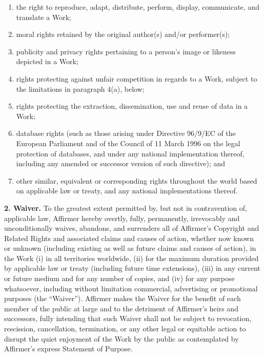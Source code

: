 \begin{enumerate}[noitemsep,label=\roman*.]
  
  \item the right to reproduce, adapt, distribute, perform,
  display, communicate, and translate a Work;
  
  \item  moral rights retained by the original author(s) and/or
  performer(s);
  
  \item publicity and privacy rights pertaining to a person's
  image or likeness depicted in a Work;
  
  \item rights protecting against unfair competition in regards
  to a Work, subject to the limitations in paragraph 4(a),
  below;
  
  \item rights protecting the extraction, dissemination, use and
  reuse of data in a Work;
  
  \item database rights (such as those arising under Directive
  96/9/EC of the European Parliament and of the Council of 11
  March 1996 on the legal protection of databases, and under
  any national implementation thereof, including any amended
  or successor version of such directive); and
  
  \item other similar, equivalent or corresponding rights
  throughout the world based on applicable law or treaty, and
  any national implementations thereof.

\end{enumerate}

\noindent \textbf{2. Waiver.} To the greatest extent
permitted by, but not in contravention of, applicable law,
Affirmer hereby overtly, fully, permanently, irrevocably and
unconditionally waives, abandons, and surrenders all of
Affirmer's Copyright and Related Rights and associated claims
and causes of action, whether now known or unknown (including
existing as well as future claims and causes of action), in
the Work (i) in all territories worldwide, (ii) for the
maximum duration provided by applicable law or treaty
(including future time extensions), (iii) in any current or
future medium and for any number of copies, and (iv) for any
purpose whatsoever, including without limitation commercial,
advertising or promotional purposes (the ``Waiver''). Affirmer
makes the Waiver for the benefit of each member of the public
at large and to the detriment of Affirmer's heirs and
successors, fully intending that such Waiver shall not be
subject to revocation, rescission, cancellation, termination,
or any other legal or equitable action to disrupt the quiet
enjoyment of the Work by the public as contemplated by
Affirmer's express Statement of Purpose.


